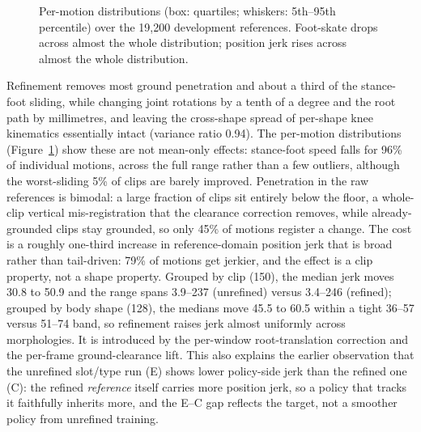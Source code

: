 \begin{figure}[t]
\centering
{}
\caption{Per-motion distributions (box: quartiles; whiskers: 5th--95th
percentile) over the 19,200 development references. Foot-skate drops across
almost the whole distribution; position jerk rises across almost the whole
distribution.}\label{fig:refine_dist}
\end{figure}

Refinement removes most ground penetration and about a third of the
stance-foot sliding, while changing joint rotations by a tenth of a degree
and the root path by millimetres, and leaving the cross-shape spread of
per-shape knee kinematics essentially intact (variance ratio 0.94). The
per-motion distributions (Figure~\ref{fig:refine_dist}) show these are not
mean-only effects: stance-foot speed falls for 96\% of individual motions,
across the full range rather than a few outliers, although the worst-sliding
5\% of clips are barely improved. Penetration in the raw references is bimodal: a large fraction of clips sit
entirely below the floor, a whole-clip vertical mis-registration that the
clearance correction removes, while already-grounded clips stay grounded, so
only 45\% of motions register a change. The cost is a roughly one-third
increase in reference-domain position jerk that is broad rather than
tail-driven: 79\% of motions get jerkier, and the effect is a clip property,
not a shape property. Grouped by clip (150), the median jerk moves 30.8 to
50.9 and the range spans 3.9--237 (unrefined) versus 3.4--246 (refined);
grouped by body shape (128), the medians move 45.5 to 60.5 within a tight
36--57 versus 51--74 band, so refinement raises jerk almost uniformly across
morphologies. It is introduced by the per-window root-translation correction
and the per-frame ground-clearance lift. This also explains the
earlier observation that the unrefined slot/type run (E) shows lower
policy-side jerk than the refined one (C): the refined \emph{reference} itself
carries more position jerk, so a policy that tracks it faithfully inherits
more, and the E--C gap reflects the target, not a smoother policy from
unrefined training.

